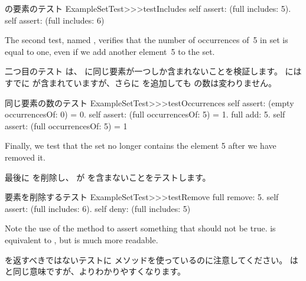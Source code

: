 \documentclass[a4paper,10pt,twoside]{book}
\begin{document}
\begin{method}[testIncludes]{ の要素のテスト}
ExampleSetTest>>>testIncludes
	self assert: (full includes: 5).
	self assert: (full includes: 6)
\end{method}

The second test, named , verifies that the
number of occurrences of~5 in  set is equal to one, even if we
add another element~5 to the set.
\fi

二つ目のテスト  は、  に同じ要素が一つしか含まれないことを検証します。  にはすでに  が含まれていますが、さらに  を追加しても  の数は変わりません。

\begin{method}[testOccurrences]{同じ要素の数のテスト}
ExampleSetTest>>>testOccurrences
	self assert: (empty occurrencesOf: 0) = 0.
	self assert: (full occurrencesOf: 5) = 1.
	full add: 5.
	self assert: (full occurrencesOf: 5) = 1
\end{method}

Finally, we test that the set no
longer contains the element 5 after we have removed it.
\fi

最後に  を削除し、  が  を含まないことをテストします。

\begin{method}[testRemove]{要素を削除するテスト}
ExampleSetTest>>>testRemove
	full remove: 5.
	self assert: (full includes: 6).
	self deny: (full includes: 5)
\end{method}

\noindent
Note the use of the method  to assert something that should not be true.
 is equivalent to , but is much more readable.
\fi

\noindent
{} を返すべきではないテストに  メソッドを使っているのに注意してください。
 は  と同じ意味ですが、よりわかりやすくなります。

\end{document}

